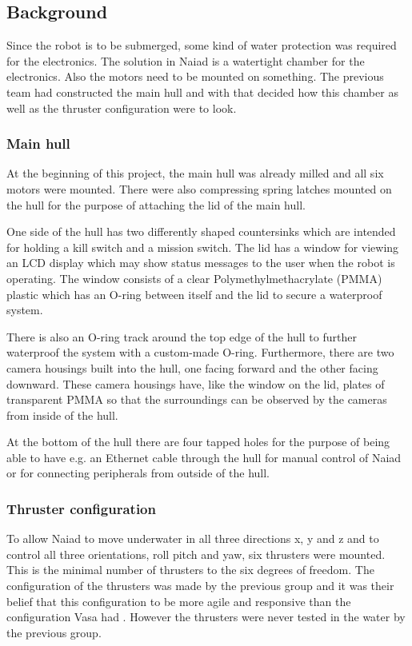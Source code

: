 \subsection{Background} %
Since the robot is to be submerged, some kind of water protection was required for the electronics. The solution in Naiad is a watertight chamber for the electronics. Also the motors need to be mounted on something. The previous team had constructed the main hull and with that decided how this chamber as well as the thruster configuration were to look. 

	\subsubsection{Main hull} %
	\noindent At the beginning of this project, the main hull was already milled and all six motors were mounted. There were also compressing spring latches mounted on the hull for the purpose of attaching the lid of the main hull. 

One side of the hull has two differently shaped countersinks which are intended for holding a kill switch and a mission switch. The lid has a window for viewing an LCD display which may show status messages to the user when the robot is operating. The window consists of a clear Polymethylmethacrylate (PMMA) plastic which has an O-ring between itself and the lid to secure a waterproof system. 

There is also an O-ring track around the top edge of the hull to further waterproof the system with a custom-made O-ring. Furthermore, there are two camera housings built into the hull, one facing forward and the other facing downward. These camera housings have, like the window on the lid, plates of transparent PMMA so that the surroundings can be observed by the cameras from inside of the hull.

At the bottom of the hull there are four tapped holes for the purpose of being able to have e.g. an Ethernet cable through the hull for manual control of Naiad or for connecting peripherals from outside of the hull. 

	\subsubsection{Thruster configuration} %
	
To allow Naiad to move underwater in all three directions x, y and z and to control all three orientations, roll pitch and yaw, six thrusters were mounted. This is the minimal number of thrusters to the six degrees of freedom. The configuration of the thrusters was made by the previous group and it was their belief that this configuration to be more agile and responsive than the configuration Vasa had \cite{Vasadoc}. However the thrusters were never tested in the water by the previous group.

